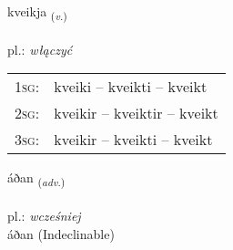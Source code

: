 \documentclass[frontgrid, backgrid]{flacards}\usepackage[]{graphicx}\usepackage[]{xcolor}
\begin{document}
\renewcommand{\blhead}{\vskip5pt {\small\bfseries\footnotesize Sagnorð | Verb }}
\renewcommand{\bcfoot}{\vskip5pt \hspace{2pt}{\small\bfseries\footnotesize 2K}}


{kveikja \small{\textsubscript{(\textit{v.})}} \\[1ex] %
\textphonetic{[kʰveiːca]} \\
pl.: \emph{włączyć} \\  [2ex]
\renewcommand*{\arraystretch}{0.8}
\begin{tabular}{p{1cm}l}
\textsc{1sg}: & kveiki -- kveikti -- kveikt \\ 
\textsc{2sg}: & kveikir -- kveiktir -- kveikt \\ 
\textsc{3sg}: & kveikir -- kveikti -- kveikt \\ 
\end{tabular}
}


\renewcommand{\flhead}{\vskip5pt \fboxsep=0pt {\small\bfseries\footnotesize Atviksorð | Adverb}}
\renewcommand{\fcfoot}{\vskip5pt \fboxsep=0pt \hspace{2pt}{\small\bfseries\footnotesize 2K}}

\renewcommand{\blhead}{\vskip5pt {\small\bfseries\footnotesize Atviksorð | Adverb }}
\renewcommand{\bcfoot}{\vskip5pt \hspace{2pt}{\small\bfseries\footnotesize 2K}}


{áðan \small{\textsubscript{(\textit{adv.})}} \\[1ex]
\textphonetic{[auːðan]} \\
pl.: \emph{wcześniej} \\  [2ex]
áðan (Indeclinable)}

\renewcommand{\flhead}{\vskip5pt \fboxsep=0pt {\small\bfseries\footnotesize Nafnorð | Noun}}
\renewcommand{\fcfoot}{\vskip5pt \fboxsep=0pt \hspace{2pt}{\small\bfseries\footnotesize 2K}}

\renewcommand{\blhead}{\vskip5pt {\small\bfseries\footnotesize Nafnorð | Noun }}
\renewcommand{\bcfoot}{\vskip5pt \hspace{2pt}{\small\bfseries\footnotesize 2K}}
\end{document}
